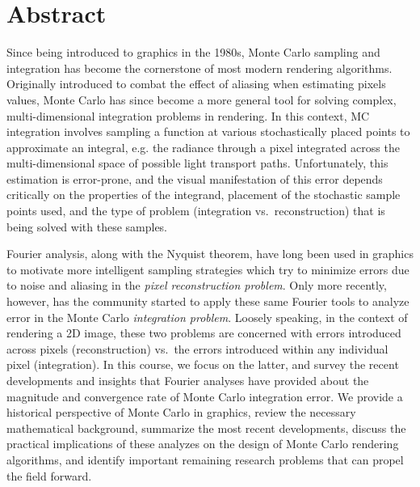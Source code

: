 \documentclass[11pt,fleqn]{book} %
\begin{document}



\pagestyle{plain}

{

\cleardoublepage
{}
{}
\section*{Abstract}
Since being introduced to graphics in the 1980s, Monte Carlo sampling and integration has become the cornerstone of most modern rendering algorithms. Originally introduced to combat the effect of aliasing  when estimating pixels values, Monte Carlo has since become a more general tool for solving complex, multi-dimensional integration problems in rendering. In this context, MC integration involves sampling a function at various stochastically placed points to approximate an integral, e.g. the radiance through a pixel integrated across the multi-dimensional space of possible light transport paths. Unfortunately, this estimation is error-prone, and the visual manifestation of this error depends critically on the properties of the integrand, placement of the stochastic sample points used, and the type of problem (integration vs.\ reconstruction) that is being solved with these samples.

Fourier analysis, along with the Nyquist theorem, have long been used in graphics to motivate more intelligent sampling strategies which try to minimize errors due to noise and aliasing in the \textit{pixel reconstruction problem}. Only more recently, however, has the community started to apply these same Fourier tools to analyze error in the Monte Carlo \textit{integration problem}. Loosely speaking, in the context of rendering a 2D image, these two problems are concerned with errors introduced across pixels (reconstruction) vs.\ the errors introduced within any individual pixel (integration). In this course, we focus on the latter, and survey the recent developments and insights that Fourier analyses have provided about the magnitude and convergence rate of Monte Carlo integration error. We provide a historical perspective of Monte Carlo in graphics, review the necessary mathematical background, summarize the most recent developments, discuss the practical implications of these analyzes on the design of Monte Carlo rendering algorithms, and identify important remaining research problems that can propel the field forward.
}
\end{document}

